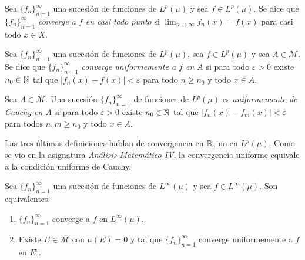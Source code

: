 \documentclass[a4paper, 11pt, oneside]{report}
\begin{document}
\begin{definition}
  Sea $\{f_n\}_{n=1}^\infty$ una sucesión de funciones de $L^p(\mu)$ y sea $f \in L^p(\mu)$. Se dice que $\{f_n\}_{n=1}^\infty$ \emph{converge a $f$ en casi todo punto} si $\lim_{n \to \infty} f_n(x) = f(x)$ para casi todo $x \in X$. 
\end{definition}

\begin{definition}
  Sea $\{f_n\}_{n=1}^\infty$ una sucesión de funciones de $L^p(\mu)$, sea $f \in L^p(\mu)$ y sea $A \in \mathcal{M}$. Se dice que $\{f_n\}_{n=1}^\infty$ \emph{converge uniformemente a $f$ en $A$} si para todo $\varepsilon > 0$ existe $n_0 \in \mathbb N$ tal que $|f_n(x)-f(x)| < \varepsilon$ para todo $n \geq n_0$ y todo $x \in A$.
\end{definition}

\begin{definition}
  Sea $A \in \mathcal{M}$. Una sucesión $\{f_n\}_{n=1}^\infty$ de funciones de $L^p(\mu)$ es \emph{uniformemente de Cauchy en $A$} si para todo $\varepsilon > 0$ existe $n_0 \in \mathbb N$ tal que $|f_n(x)-f_m(x)| < \varepsilon$ para todos $n,m \geq n_0$ y todo $x \in A$.
\end{definition}

Las tres últimas definiciones hablan de convergencia en $\mathbb R$, no en $L^p(\mu)$. Como se vio en la asignatura \emph{Análisis Matemático IV}, la convergencia uniforme equivale a la condición uniforme de Cauchy.

\begin{proposition}\label{pro:1.8.6}
  Sea $\{f_n\}_{n=1}^\infty$ una sucesión de funciones de $L^\infty(\mu)$ y sea $f \in L^\infty(\mu)$. Son equivalentes:
  \begin{enumerate}
    \item $\{f_n\}_{n=1}^\infty$ converge a $f$ en $L^\infty(\mu)$.
    \item Existe $E \in \mathcal{M}$ con $\mu(E)=0$ y tal que $\{f_n\}_{n=1}^\infty$ converge uniformemente a $f$ en $E^c$.
  \end{enumerate}
\end{proposition}
\end{document}
